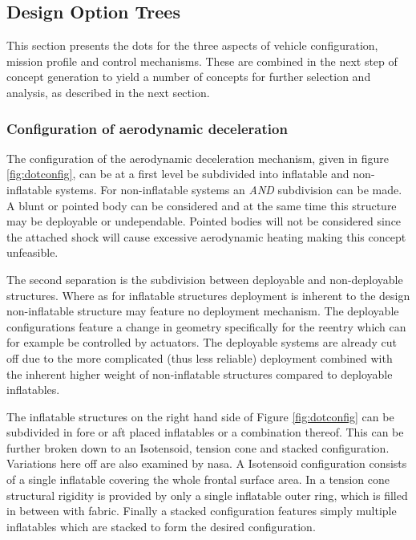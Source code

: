 \subsection{Design Option Trees}
This section presents the \gls{dot}s for the three aspects of vehicle configuration, mission profile and control mechanisms. These are combined in the next step of concept generation to yield a number of concepts for further selection and analysis, as described in the next section.
\subsubsection{Configuration of aerodynamic deceleration}
The configuration of the aerodynamic deceleration mechanism, given in figure \ref{fig:dotconfig}, can be at a first level be subdivided into inflatable and non-inflatable systems. For non-inflatable systems an \textit{AND} subdivision can be made. A blunt or pointed body can be considered and at the same time this structure may be deployable or undependable. Pointed bodies will not be considered since the attached shock will cause excessive aerodynamic heating \cite{AndersonJr.2007} making this concept unfeasible. 


The second separation is  the subdivision between deployable and non-deployable structures. Where as for inflatable structures deployment is inherent to the design non-inflatable structure may feature no deployment mechanism. The deployable configurations feature a change in geometry specifically for the reentry which can for example be controlled by actuators. The deployable systems are already cut off due to the more complicated (thus less reliable) deployment combined with the inherent higher weight of non-inflatable structures \cite{Cianciolo2010} compared to deployable inflatables.

The inflatable structures on the right hand side of Figure \ref{fig:dotconfig} can be subdivided in fore or aft placed inflatables or a combination thereof. This can be further broken down to an Isotensoid, tension cone and stacked configuration. Variations here off are also examined by \gls{nasa}\cite{Smith2010}. A Isotensoid configuration consists of a single inflatable covering the whole frontal surface area. In a tension cone structural rigidity is provided by only a single inflatable outer ring, which is filled in between with fabric. Finally a stacked configuration features simply multiple inflatables which are stacked to form the desired configuration.

